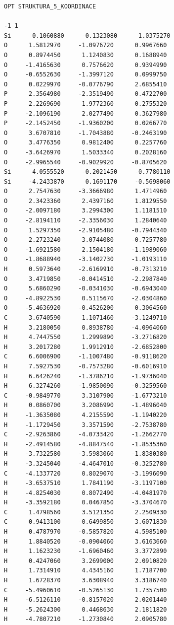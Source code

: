 \documentclass[
digital, %
table,   %
lof,     %
lot,     %
oneside,
]{fithesis3}
\begin{document}
\begin{lstlisting}[frame=single, caption={struktura koordinace 5},label=DescriptiveLabel]
OPT STRUKTURA_5_KOORDINACE

-1 1
Si      0.1060880     -0.1323080      1.0375270
O      1.5812970     -1.0976720      0.9967660
O      0.8974450      1.1240830      0.1688940
O     -1.4165630      0.7576620      0.9394990
O     -0.6552630     -1.3997120      0.0999750
O      0.0229970     -0.0776790      2.6855410
P      2.3564980     -2.3519490      0.4722700
P      2.2269690      1.9772360      0.2755320
P     -2.1096190      2.0277490      0.3627980
P     -2.1452450     -1.9360200      0.0266770
O      3.6707810     -1.7043880     -0.2463190
O      3.4776350      0.9812400      0.2257760
O     -3.6426970      1.5033340      0.2028160
O     -2.9965540     -0.9029920     -0.8705620
Si      4.0555520     -0.2021450     -0.7780110
Si     -4.2433870      0.1691170     -0.5698060
O      2.7547630     -3.3666980      1.4714960
O      2.3423360      2.4397160      1.8129550
O     -2.0097180      3.2994300      1.1181510
O     -2.8194110     -2.3356030      1.2840640
O      1.5297350     -2.9105480     -0.7944340
O      2.2723240      3.0744080     -0.7257780
O     -1.6921580      2.1504180     -1.1989060
O     -1.8688940     -3.1402730     -1.0193110
H      0.5973640     -2.6169910     -0.7313210
O      3.4719850     -0.0414510     -2.2987840
O      5.6860290     -0.0341030     -0.6943040
O     -4.8922530      0.5115670     -2.0304860
O     -5.4636920     -0.4526200      0.3064560
C      3.6740590      1.1071460     -3.1249710
H      3.2180050      0.8938780     -4.0964060
H      4.7447550      1.2999890     -3.2716820
H      3.2017280      1.9912910     -2.6852800
C      6.6006900     -1.1007480     -0.9118620
H      7.5927530     -0.7573280     -0.6016910
H      6.6426240     -1.3786210     -1.9736040
H      6.3274260     -1.9850090     -0.3259560
C     -0.9849770      3.3107900     -1.6773210
H      0.0860700      3.2086990     -1.4896040
H     -1.3635080      4.2155590     -1.1940220
H     -1.1729450      3.3571590     -2.7538780
C     -2.9263860     -4.0733420     -1.2662770
H     -2.4914580     -4.8847540     -1.8535360
H     -3.7322580     -3.5983060     -1.8380380
H     -3.3245040     -4.4647010     -0.3252780
C     -4.1337720      0.8029070     -3.1996090
H     -3.6537510      1.7841190     -3.1197100
H     -4.8254030      0.8072490     -4.0481970
H     -3.3592180      0.0467850     -3.3704670
C      1.4798560      3.5121350      2.2509330
C      0.9413100     -0.6499850      3.6071830
H      0.4787970     -0.5857820      4.5985100
H      1.8840520     -0.0904060      3.6163660
H      1.1623230     -1.6960460      3.3772890
H      0.4247060      3.2699000      2.0910820
H      1.7314910      4.4345160      1.7187700
H      1.6728370      3.6308940      3.3186740
C     -5.4960610     -0.5265130      1.7357500
H     -6.5126110     -0.8157020      2.0201440
H     -5.2624300      0.4468630      2.1811820
H     -4.7807210     -1.2730840      2.0905780

\end{lstlisting}
\end{document}

